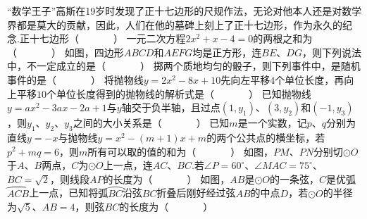 \documentclass[10pt]{article}
\begin{document}
\showsecret
{}
\mathtxt
\paperinformation
\begin{questions}{\selectingintroduction}
    \question ``数学王子''高斯在19岁时发现了正十七边形的尺规作法，无论对他本人还是对数学界都是莫大的贡献，因此，人们在他的墓碑上刻上了正十七边形，作为永久的纪念.正十七边形（~~~~~~~）
    \question 一元二次方程$2x^2+x-4=0$的两根之和为（~~~~~~~）
    \question 如图，四边形$ABCD$和$AEFG$均是正方形，连$BE$、$DG$，则下列说法中，不一定成立的是（~~~~~~~）
    \question 掷两个质地均匀的骰子，则下列事件中，是随机事件的是（~~~~~~~）
    \question 将抛物线$y=2x^2-8x+10$先向左平移$4$个单位长度，再向上平移$10$个单位长度得到的抛物线的解析式是（~~~~~~~）
    \question 已知抛物线$y=ax^2-3ax-2a+1$与$y$轴交于负半轴，且过点$(1,y_1)$、$(3,y_2)$和$(-1,y_3)$，则$y_1$、$y_2$、$y_3$之间的大小关系是（~~~~~~~）
    \question 已知$m$是一个实数，记$p$、$q$分别为直线$y=-x$与抛物线$y=x^2-(m+1)x+m$的两个公共点的横坐标，若$p^2+mq=6$，则$m$所有可以取的值的和为（~~~~~~~）
    \question 如图，$PM$、$PN$分别切$\odot O$于$A$、$B$两点，$C$为$\odot O$上一点，连$AC$、$BC$.若$\angle P=60^{\circ}$、$\angle MAC=75^{\circ}$、$BC=\sqrt{2}$，则线段$AP$的长度为（~~~~~~~）
    \question 如图，$AB$是$\odot O$的一条弦，$C$是优弧$\wideparen{ACB}$上一点，已知将弧$\wideparen{BC}$沿弦$BC$折叠后刚好经过弦$AB$的中点$D$，若$\odot O$的半径为$\sqrt{5}$、$AB=4$，则弦$BC$的长度为（~~~~~~~）
    \begin{figure}[!htb]
        \centering
\end{figure}
\end{questions}
\end{document}
